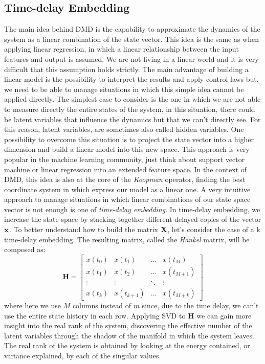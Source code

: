 \documentclass[]{article}
\begin{document}
\subsection{Time-delay Embedding}
The main idea behind DMD is the capability to approximate the dynamics of the system as a linear combination of the state vector. This idea is the same as when applying linear regression, in which a linear relationship between the input features and output is assumed. We are not living in a linear world and it is very difficult that this assumption holds strictly. The main advantage of building a linear model is the possibility to interpret the results and apply control laws but, we need to be able to manage situations in which this simple idea cannot be applied directly. The simplest case to consider is the one in which we are not able to measure directly the entire states of the system, in this situation, there could be latent variables that influence the dynamics but that we can't directly see. For this reason, latent variables, are sometimes also called hidden variables. One possibility to overcome this situation is to project the state vector into a higher dimension and build a linear model into this new space. This approach is very popular in the machine learning community, just think about support vector machine or linear regression into an extended feature space. In the context of DMD, this idea is also at the core of the \textit{Koopman} operator, finding the best coordinate system in which express our model as a linear one. A very intuitive approach to manage situations in which linear combinations of our state space vector is not enough is one of \textit{time-delay embedding}. In time-delay embedding, we increase the state space by stacking together different delayed copies of the vector $\textbf x$. To better understand how to build the matrix $\textbf X$, let's consider the case of a k time-delay embedding. The resulting matrix, called the \textit{Hankel} matrix, will be composed as:
\begin{equation}
\textbf{H} = 
    \begin{bmatrix}
        x(t_0) & x(t_1) & \dots &  x(t_M)\\
        x(t_1) & x(t_2) & \dots &  x(t_{M+1})\\
        \vdots &  \vdots & \ddots &  \vdots \\
        x(t_k) & x(t_{k+1}) & \dots &  x(t_{M+k}) 
    \end{bmatrix}
\end{equation}
where here we use $M$ columns instead of $m$ since, due to the time delay, we can't use the entire state history in each row. Applying SVD to $\textbf{H}$ we can gain more insight into the real rank of the system, discovering the effective number of the latent variables through the shadow of the manifold in which the system leaves. The real rank of the system is obtained by looking at the energy contained, or variance explained, by each of the singular values.
\end{document}
